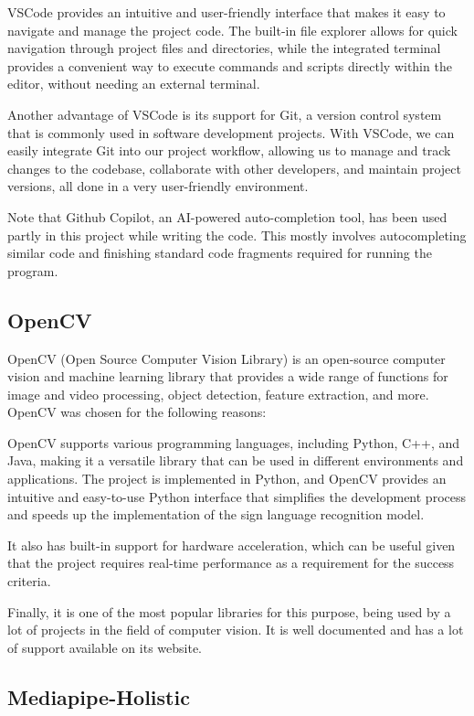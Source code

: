 \documentclass[final,rdr32.tex]{subfiles}
\begin{document}
VSCode provides an intuitive and user-friendly interface that makes it easy to navigate and manage the project code. The built-in file explorer allows for quick navigation through project files and directories, while the integrated terminal provides a convenient way to execute commands and scripts directly within the editor, without needing an external terminal.

Another advantage of VSCode is its support for Git, a version control system that is commonly used in software development projects. With VSCode, we can easily integrate Git into our project workflow, allowing us to manage and track changes to the codebase, collaborate with other developers, and maintain project versions, all done in a very user-friendly environment.

Note that Github Copilot, an AI-powered auto-completion tool, has been used partly in this project while writing the code. This mostly involves autocompleting similar code and finishing standard code fragments required for running the program.

\subsection{OpenCV}

OpenCV (Open Source Computer Vision Library) is an open-source computer vision and machine learning library that provides a wide range of functions for image and video processing, object detection, feature extraction, and more. OpenCV was chosen for the following reasons:

OpenCV supports various programming languages, including Python, C++, and Java, making it a versatile library that can be used in different environments and applications. The project is implemented in Python, and OpenCV provides an intuitive and easy-to-use Python interface that simplifies the development process and speeds up the implementation of the sign language recognition model.

It also has built-in support for hardware acceleration, which can be useful given that the project requires real-time performance as a requirement for the success criteria.

Finally, it is one of the most popular libraries for this purpose, being used by a lot of projects in the field of computer vision. It is well documented and has a lot of support available on its website.

\subsection{Mediapipe-Holistic}
\label{sec:mediapipe-holistic}
\end{document}
